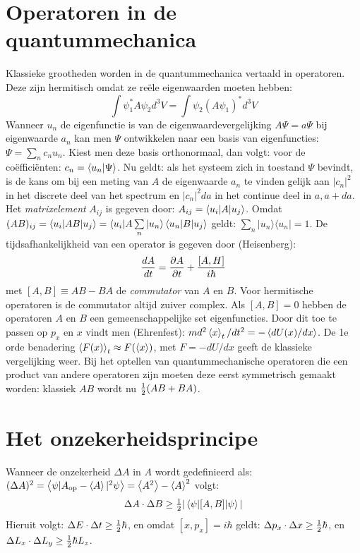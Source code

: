 \documentclass[twoside]{report}
\begin{document}
\section[~~Operatoren in de quantummechanica]{Operatoren in de quantummechanica}
Klassieke grootheden worden in de quantummechanica vertaald in operatoren.
Deze zijn hermitisch omdat ze re\"ele eigenwaarden moeten hebben:
\[
\int\psi_1^*A\psi_2d^3V=\int\psi_2(A\psi_1)^*d^3V
\]
Wanneer $u_n$ de eigenfunctie is van de eigenwaardevergelijking
$A\Psi=a\Psi$ bij eigenwaarde $a_n$ kan men $\Psi$ ontwikkelen naar een
basis van eigenfuncties: $\Psi=\sum\limits_nc_nu_n$. Kiest men deze basis
orthonormaal, dan volgt: voor de co\"effici\"enten: $c_n=\left\langle u_n|\Psi \right\rangle$. Nu
geldt: als het systeem zich in toestand $\Psi$ bevindt, is de kans om bij een
meting van $A$ de eigenwaarde $a_n$ te vinden gelijk aan $|c_n|^2$ in het
discrete deel van het spectrum en $|c_n|^2da$ in het continue deel in
$a,a+da$. Het {\it matrixelement} $A_{ij}$ is gegeven door:
$A_{ij}=\left\langle u_i|A|u_j \right\rangle$. Omdat
$(AB)_{ij}=\left\langle u_i|AB|u_j \right\rangle=\langle u_i|A\sum\limits_n|u_n\rangle\left\langle u_n|B|u_j \right\rangle$
geldt: $\sum\limits_n|u_n\rangle\langle u_n|=1$.
\npar
De tijdsafhankelijkheid van een operator is gegeven door (Heisenberg):
\[
\frac{dA}{dt}=\frac{\partial A}{\partial t}+\frac{[A,H]}{i\hbar}
\]
met $[A,B]\equiv AB-BA$ de {\it commutator} van $A$ en $B$. Voor hermitische
operatoren is de commutator altijd zuiver complex. Als $[A,B]=0$ hebben
de operatoren $A$ en $B$ een gemeenschappelijke set eigenfuncties. Door dit
toe te passen op $p_x$ en $x$ vindt men (Ehrenfest):
$md^2\left\langle x \right\rangle_t/dt^2=-\left\langle dU(x)/dx \right\rangle$.
\npar
De 1e orde benadering $\left\langle F(x) \right\rangle_t\approx F(\left\langle x \right\rangle)$, met $F=-dU/dx$ geeft de
klassieke vergelijking weer.
\npar
Bij het optellen van quantummechanische operatoren die een product van andere
operatoren zijn moeten deze eerst symmetrisch gemaakt worden: klassiek $AB$
wordt nu $\mbox{$\frac{1}{2}$}(AB+BA)$.

\section[~~Het onzekerheidsprincipe]{Het onzekerheidsprincipe}
Wanneer de onzekerheid $\Delta A$ in $A$ wordt gedefinieerd als:
$(\Delta A)^2=\left\langle \psi|A_{\rm op}-\left\langle A \right\rangle|^2\psi \right\rangle=\left\langle A^2 \right\rangle-\left\langle A \right\rangle^2$ volgt:
\[
\Delta A\cdot\Delta B\geq\mbox{$\frac{1}{2}$}|\left\langle \psi|[A,B]|\psi \right\rangle|
\]
Hieruit volgt: $\Delta E\cdot\Delta t\geq\mbox{$\frac{1}{2}$}\hbar$, en omdat
$[x,p_x]=i\hbar$ geldt: $\Delta p_x\cdot\Delta x\geq\mbox{$\frac{1}{2}$}\hbar$, en
$\Delta L_x\cdot\Delta L_y\geq\mbox{$\frac{1}{2}$}\hbar L_z$.
\end{document}
